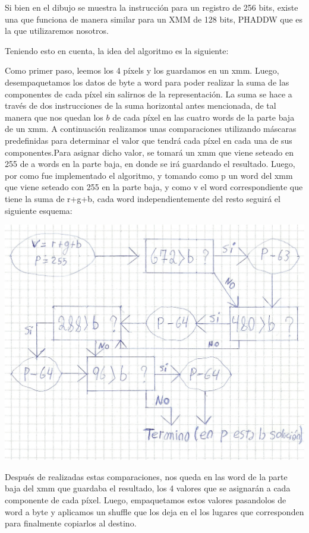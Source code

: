 \documentclass[a4paper]{article}
\begin{document}
Si bien en el dibujo se muestra la instrucción para un registro de 256 bits, existe una que funciona de manera similar para un XMM de 128 bits, PHADDW que es la que utilizaremos nosotros.

Teniendo esto en cuenta, la idea del algoritmo es la siguiente:

Como primer paso, leemos los 4 píxels y los guardamos en un xmm. Luego, desempaquetamos los datos de byte a word para poder realizar la suma de las componentes de cada píxel sin salirnos de la representación. La suma se hace a través de dos instrucciones de la suma horizontal antes mencionada, de tal manera que nos quedan los $b$ de cada píxel en las cuatro words de la parte baja de un xmm. A continuación realizamos unas comparaciones utilizando máscaras predefinidas para determinar el valor que tendrá cada píxel en cada una de sus componentes.Para asignar dicho valor, se tomará un xmm que viene seteado en 255 de a words en la parte baja, en donde se irá guardando el resultado. Luego, por como fue implementado el algoritmo, y tomando como p un word del xmm que viene seteado con 255 en la parte baja, y como v el word correspondiente que tiene la suma de r+g+b, cada word independientemente del resto seguirá el siguiente esquema:

\begin{center}
\includegraphics[scale=0.66]{Dibujos/B1.jpg}
\end{center}


 Después de realizadas estas comparaciones, nos queda en las word de la parte baja del xmm que guardaba el resultado, los 4 valores que se asignarán a cada componente de cada píxel. Luego, empaquetamos estos valores pasandolos de word a byte y aplicamos un shuffle que los deja en el los lugares que corresponden para finalmente copiarlos al destino. 
\end{document}

